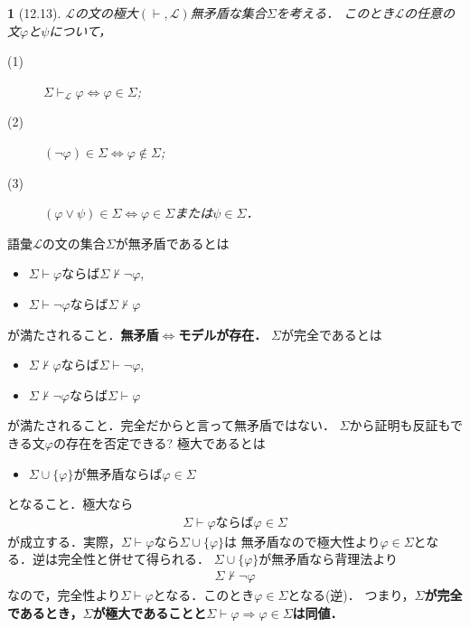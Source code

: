 \documentclass[a4j,10.5pt,oneside,openany]{jsbook}
\theoremstyle{mystyle}
\newtheorem{thm}{\color{DarkMidnightBlue}{定理}}[section]
\begin{document}
	\begin{screen}
		\begin{thm}[12.13]
			$\mathcal{L}$の文の極大$(\vdash,\mathcal{L})$無矛盾な集合$\Sigma$を考える．
			このとき$\mathcal{L}$の任意の文$\varphi$と$\psi$について，
			\begin{description}
				\item[(1)] $\Sigma \vdash_{\mathcal{L}} \varphi
					\Longleftrightarrow \varphi \in \Sigma$;
				
				\item[(2)] $(\neg \varphi) \in \Sigma \Longleftrightarrow
					\varphi \notin \Sigma$;
				
				\item[(3)] $(\varphi \vee \psi) \in \Sigma \Longleftrightarrow
					\varphi \in \Sigma$または$\psi \in \Sigma$．
			\end{description}
		\end{thm}
	\end{screen}
	
	語彙$\mathcal{L}$の文の集合$\Sigma$が無矛盾であるとは
	\begin{itemize}
		\item $\Sigma \vdash \varphi$ならば$\Sigma \not\vdash \neg \varphi$,
		\item $\Sigma \vdash \neg \varphi$ならば$\Sigma \not\vdash \varphi$
	\end{itemize}
	が満たされること．{\bf 無矛盾$\Longleftrightarrow$モデルが存在．}
	$\Sigma$が完全であるとは
	\begin{itemize}
		\item $\Sigma \not\vdash \varphi$ならば$\Sigma \vdash \neg \varphi$,
		\item $\Sigma \not\vdash \neg \varphi$ならば$\Sigma \vdash \varphi$
	\end{itemize}
	が満たされること．完全だからと言って無矛盾ではない．
	$\Sigma$から証明も反証もできる文$\varphi$の存在を否定できる?
	極大であるとは
	\begin{itemize}
		\item $\Sigma \cup \{\varphi\}$が無矛盾ならば$\varphi \in \Sigma$
	\end{itemize}
	となること．極大なら
	\begin{align}
		 \mbox{$\Sigma \vdash \varphi$ならば$\varphi \in \Sigma$}
	\end{align}
	が成立する．実際，$\Sigma \vdash \varphi$なら$\Sigma \cup \{\varphi\}$は
	無矛盾なので極大性より$\varphi \in \Sigma$となる．逆は完全性と併せて得られる．
	$\Sigma \cup \{\varphi\}$が無矛盾なら背理法より
	\begin{align}
		\Sigma \not\vdash \neg \varphi
	\end{align}
	なので，完全性より$\Sigma \vdash \varphi$となる．このとき$\varphi \in \Sigma$となる(逆)．
	つまり，{\bf $\Sigma$が完全であるとき，$\Sigma$が極大であることと$\Sigma \vdash \varphi
	\Longrightarrow \varphi \in \Sigma$は同値．}
	
\end{document}
